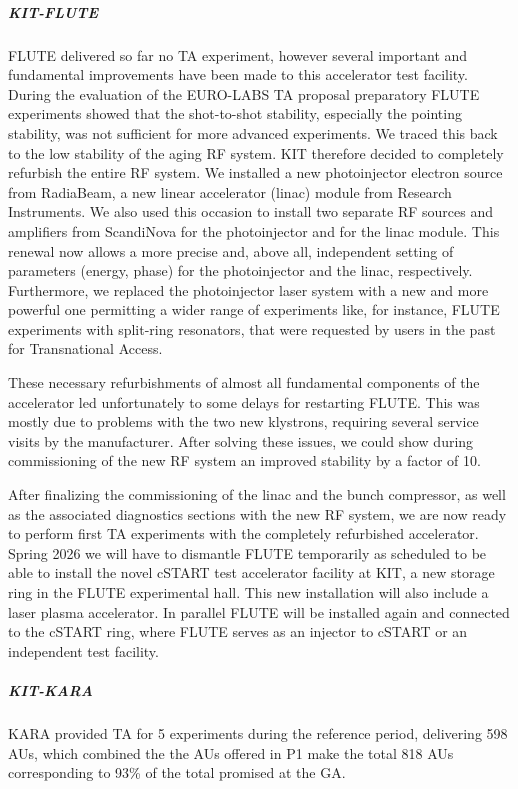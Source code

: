 
\subparagraph{KIT-FLUTE} FLUTE delivered so far no TA experiment, however several important and fundamental improvements have been made to this accelerator test facility. During the evaluation of the EURO-LABS TA proposal preparatory FLUTE experiments showed that the shot-to-shot stability, especially the pointing stability, was not sufficient for more advanced experiments. We traced this back to the low stability of the aging RF system. KIT therefore decided to completely refurbish the entire RF system. We installed a new photoinjector electron source from RadiaBeam, a new linear accelerator (linac) module from Research Instruments. We also used this occasion to install two separate RF sources and amplifiers from ScandiNova for the photoinjector and for the linac module. This renewal now allows a more precise and, above all, independent setting of parameters (energy, phase) for the photoinjector and the linac, respectively. Furthermore, we replaced the photoinjector laser system with a new and more powerful one permitting a wider range of experiments like, for instance, FLUTE experiments with split-ring resonators, that were requested by users in the past for Transnational Access.

These necessary refurbishments of almost all fundamental components of the accelerator led unfortunately to some delays for restarting FLUTE. This was mostly due to problems with the two new klystrons, requiring several service visits by the manufacturer. After solving these issues, we could show during commissioning of the new RF system an improved stability by a factor of 10.

After finalizing the commissioning of the linac and the bunch compressor, as well as the associated diagnostics sections with the new RF system, we are now ready to perform first TA experiments with the completely refurbished accelerator. 
Spring 2026 we will have to dismantle FLUTE temporarily as scheduled to be able to install the novel cSTART test accelerator facility at KIT, a new storage ring in the FLUTE experimental hall. This new installation will also include a laser plasma accelerator. In parallel FLUTE will be installed again and connected to the cSTART ring, where FLUTE serves as an injector to cSTART or an independent test facility.

\subparagraph{KIT-KARA}

KARA provided TA for 5 experiments during the reference period, delivering 598 AUs, which combined the the AUs offered in P1 make the total 818 AUs corresponding to 93\% of the total promised at the GA. 

